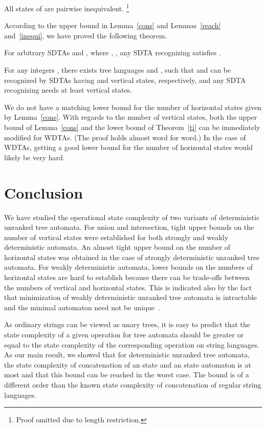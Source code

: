 \documentclass[copyright]{eptcs}
\begin{document}
\begin{lemma}
All states of  are pairwise inequivalent. \footnote{Proof
omitted due to length restriction.} \label{inequi}
\end{lemma}

According to the upper bound in Lemma~\ref{cons} and
Lemmas~\ref{reach} and~\ref{inequi}, we have proved the following
theorem.

\begin{theorem}\label{ti}
For arbitrary SDTAs  and , where
, , any SDTA
 recognizing  satisfies
.

For any integers , there exists tree languages  and
, such that  and  can be recognized by  SDTAs
having  and  vertical states, respectively,
 and any SDTA recognizing
 needs at least 
vertical states.
\end{theorem}

We do not have a matching lower bound for the number of horizontal
states given by Lemma~\ref{cons}. With regards to the number of
vertical states, both the upper bound of Lemma~\ref{cons} and the
lower bound of Theorem~\ref{ti} can be immediately modified for
WDTAs. (The proof holds almost word for word.)  In the case of
WDTAs, getting a good lower bound for the number of horizontal
states would likely be very hard.

\section{Conclusion}

We have studied the operational state complexity of two variants
of deterministic unranked tree automata. For  union and
intersection, tight upper bounds on the number of vertical states
were established for both strongly and weakly deterministic
automata. An almost tight upper bound on the number of horizontal
states was obtained in the case of strongly deterministic unranked
tree automata. For weakly deterministic  automata,
lower bounds on the numbers of horizontal states are hard to
establish because there can be trade-offs between the numbers of
vertical and horizontal states.
This is indicated also by the fact that minimization of weakly
deterministic unranked tree automata is intractable and the
minimal automaton need not be unique~\cite{mn}.

As  ordinary
strings can be viewed as unary trees, it is easy to predict that
the state complexity of a given operation for tree automata should
be greater or equal to  the state complexity of the corresponding
operation on string languages.
As our main result, we showed that for
deterministic unranked tree automata, the
 state complexity of concatenation of an  state and
an  state automaton is at most 
and that this bound can be reached in the worst case.
The bound is
of a different order than the known state complexity 
of  concatenation of regular string languages.
\end{document}
